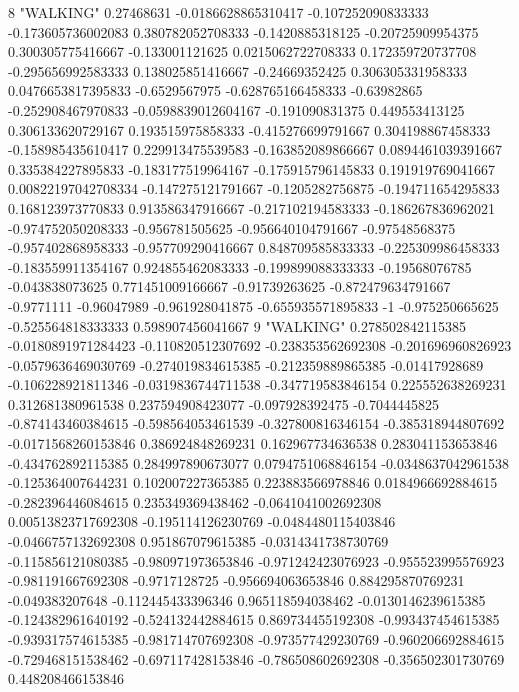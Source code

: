 8 "WALKING" 0.27468631 -0.0186628865310417 -0.107252090833333 -0.173605736002083 0.380782052708333 -0.1420885318125 -0.20725909954375 0.300305775416667 -0.133001121625 0.0215062722708333 0.172359720737708 -0.295656992583333 0.138025851416667 -0.24669352425 0.306305331958333 0.0476653817395833 -0.6529567975 -0.628765166458333 -0.63982865 -0.252908467970833 -0.0598839012604167 -0.191090831375 0.449553413125 0.306133620729167 0.193515975858333 -0.415276699791667 0.304198867458333 -0.158985435610417 0.229913475539583 -0.163852089866667 0.0894461039391667 0.335384227895833 -0.183177519964167 -0.175915796145833 0.191919769041667 0.00822197042708334 -0.147275121791667 -0.1205282756875 -0.194711654295833 0.168123973770833 0.913586347916667 -0.217102194583333 -0.186267836962021 -0.974752050208333 -0.956781505625 -0.956640104791667 -0.97548568375 -0.957402868958333 -0.957709290416667 0.848709585833333 -0.225309986458333 -0.183559911354167 0.924855462083333 -0.199899088333333 -0.19568076785 -0.043838073625 0.771451009166667 -0.91739263625 -0.872479634791667 -0.9771111 -0.96047989 -0.961928041875 -0.655935571895833 -1 -0.975250665625 -0.525564818333333 0.598907456041667
9 "WALKING" 0.278502842115385 -0.0180891971284423 -0.110820512307692 -0.238353562692308 -0.201696960826923 -0.0579636469030769 -0.274019834615385 -0.212359889865385 -0.01417928689 -0.106228921811346 -0.0319836744711538 -0.347719583846154 0.225552638269231 0.312681380961538 0.237594908423077 -0.097928392475 -0.7044445825 -0.874143460384615 -0.598564053461539 -0.327800816346154 -0.385318944807692 -0.0171568260153846 0.386924848269231 0.162967734636538 0.283041153653846 -0.434762892115385 0.284997890673077 0.0794751068846154 -0.0348637042961538 -0.125364007644231 0.102007227365385 0.223883566978846 0.0184966692884615 -0.282396446084615 0.235349369438462 -0.0641041002692308 0.00513823717692308 -0.195114126230769 -0.0484480115403846 -0.0466757132692308 0.951867079615385 -0.0314341738730769 -0.115856121080385 -0.980971973653846 -0.971242423076923 -0.955523995576923 -0.981191667692308 -0.9717128725 -0.956694063653846 0.884295870769231 -0.049383207648 -0.112445433396346 0.965118594038462 -0.0130146239615385 -0.124382961640192 -0.524132442884615 0.869734455192308 -0.993437454615385 -0.939317574615385 -0.981714707692308 -0.973577429230769 -0.960206692884615 -0.729468151538462 -0.697117428153846 -0.786508602692308 -0.356502301730769 0.448208466153846

